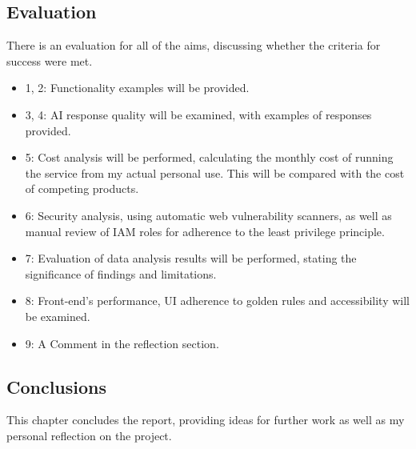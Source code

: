 \subsection{Evaluation}
There is an evaluation for all of the aims, discussing whether the criteria for success were met.
\begin{itemize}
    \item 1, 2: Functionality examples will be provided.
    \item 3, 4: AI response quality will be examined, with examples of responses provided. 
    \item 5: Cost analysis will be performed, calculating the monthly cost of running the service from my actual personal use. This will be compared with the cost of competing products.
    \item 6: Security analysis, using automatic web vulnerability scanners, as well as manual review of IAM roles for adherence to the least privilege principle.
    \item 7: Evaluation of data analysis results will be performed, stating the significance of findings and limitations.
    \item 8: Front-end's performance, UI adherence to golden rules and accessibility will be examined.
    \item 9: A Comment in the reflection section.
\end{itemize}
\subsection{Conclusions}
This chapter concludes the report, providing ideas for further work as well as my personal reflection on the project.
